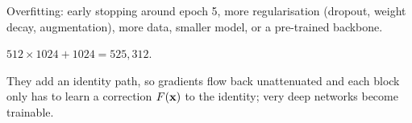 \A Overfitting: early stopping around epoch 5, more regularisation (dropout, weight decay, augmentation), more data, smaller model, or a pre-trained backbone.

\A $512\times1024+1024=525{,}312$.

\A They add an identity path, so gradients flow back unattenuated and each block only has to learn a correction $F(\mathbf{x})$ to the identity; very deep networks become trainable.
